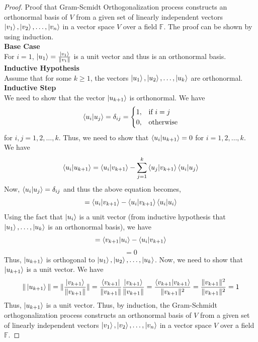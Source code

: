 \begin{proof}
    Proof that Gram-Scmidt Orthogonalization process constructs an orthonormal basis of $V$ from a given set of linearly independent vectors $\ket{v_1},\ket{v_2},\ldots,\ket{v_n}$ in a vector space $V$ over a field $\mathbb{F}$.
    The proof can be shown by using induction.\\
    \textbf{Base Case}\\
    For $i=1$, $\ket{u_1}=\frac{\ket{v_1}}{\|v_1\|}$ is a unit vector and thus is an orthonormal basis.\\
    \textbf{Inductive Hypothesis}\\
    Assume that for some $k\geq 1$, the vectors $\ket{u_1},\ket{u_2},\ldots,\ket{u_k}$ are orthonormal.\\
    \textbf{Inductive Step}\\
    We need to show that the vector $\ket{u_{k+1}}$ is orthonormal. We have
    \[
        \braket{u_i|u_j}=\delta_{ij}=
        \begin{cases}
            1, & \text{if } i=j\\
            0, & \text{otherwise}
        \end{cases}
    \]
    for $i,j=1,2,\ldots,k$. Thus, we need to show that $\braket{u_i|u_{k+1}}=0$ for $i=1,2,\ldots,k$. We have
    \[
        \braket{u_i|u_{k+1}}=\braket{u_i|v_{k+1}}-\sum_{j=1}^{k}\braket{u_j|v_{k+1}}\braket{u_i|u_j}
    \]
    Now, $\braket{u_i|u_j}=\delta_{ij}$ and thus the above equation becomes,
    \[
        =\braket{u_i|v_{k+1}}-\braket{u_i|v_{k+1}}\braket{u_i|u_i}
    \]
    Using the fact that $\ket{u_i}$ is a unit vector (from inductive hypothesis that $\ket{u_1}, \ldots, \ket{u_k}$ is an orthonormal basis), we have
    \[
        =\braket{v_{k+1}|u_i}-\braket{u_i|v_{k+1}}
    \]
    \[
        =0
    \]
    Thus, $\ket{u_{k+1}}$ is orthogonal to $\ket{u_1},\ket{u_2},\ldots,\ket{u_k}$. Now, we need to show that $\ket{u_{k+1}}$ is a unit vector. We have
    \[
        \|\ket{u_{k+1}}\|=\|\frac{\ket{v_{k+1}}}{\|v_{k+1}\|}\|=\frac{\bra{v_{k+1}}}{\|v_{k+1}\|}\frac{\ket{v_{k+1}}}{\|v_{k+1}\|}=\frac{\braket{v_{k+1}|v_{k+1}}}{\|v_{k+1}\|^2}=\frac{\|v_{k+1}\|^2}{\|v_{k+1}\|^2}=1
    \]
    Thus, $\ket{u_{k+1}}$ is a unit vector. Thus, by induction, the Gram-Schmidt orthogonalization process constructs an orthonormal basis of $V$ from a given set of linearly independent vectors $\ket{v_1},\ket{v_2},\ldots,\ket{v_n}$ in a vector space $V$ over a field $\mathbb{F}$.

\end{proof}

